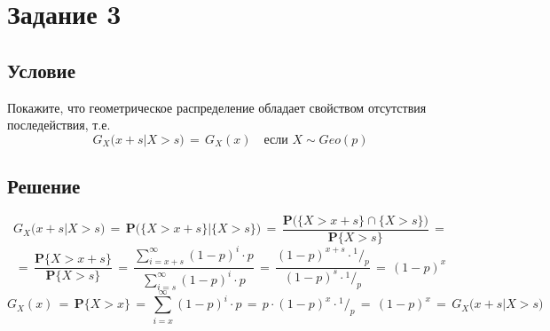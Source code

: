 \documentclass{article}
\newcommand*\rfrac[2]{{}^{#1}\!/_{#2}}
\begin{document}
\section*{Задание 3}
\subsection*{Условие}
Покажите, что геометрическое распределение обладает свойством отсутствия последействия, т.е.
\[ G_X \Big( x \! + \! s \big| X \! > \! s \Big) \, = \, G_X(x) \quad \text{если } X \! \sim \! Geo(p) \]
\subsection*{Решение}
\[ G_X \Big( x \! + \! s \big| X \! > \! s \Big) \, = \, \mathbf{P} \bigg( \big\{ X \! > \! x \! + \! s \big\} \big| \big\{ X \! > \! s \big\} \bigg) \, = \, \dfrac{\mathbf{P} \bigg( \big\{ X \! > \! x \! + \! s \big\} \cap \big\{ X \! > \! s \big\} \bigg)}{\mathbf{P} \big\{ X \! > \! s \big\}} \, = \]
\[ = \, \dfrac{\mathbf{P} \big\{ X \! > \! x \! + \! s \big\}}{\mathbf{P} \big\{ X \! > \! s \big\}} \, = \, \dfrac{\sum\limits_{i=x+s}^\infty (1 \! - \! p)^i \! \cdot \! p}{\sum\limits_{i=s}^\infty (1 \! - \! p)^i \! \cdot \! p} \, = \, \dfrac{(1 \! - \! p)^{x+s} \! \cdot \! \rfrac{1}{p}}{(1 \! - \! p)^{s} \! \cdot \! \rfrac{1}{p}} \, = \, (1 \! - \! p)^x \]
\[ G_X(x) \, = \, \mathbf{P} \big\{ X \! > \! x \big\} \, = \, \sum\limits_{i=x}^\infty (1 \! - \! p)^i \! \cdot \!p \, = \, p \! \cdot \! (1 \! - \! p)^{x} \! \cdot \! \rfrac{1}{p} \, = \, (1 \! - \! p)^{x} \, = \, G_X \Big( x \! + \! s \big| X \! > \! s \Big) \]
\end{document}
